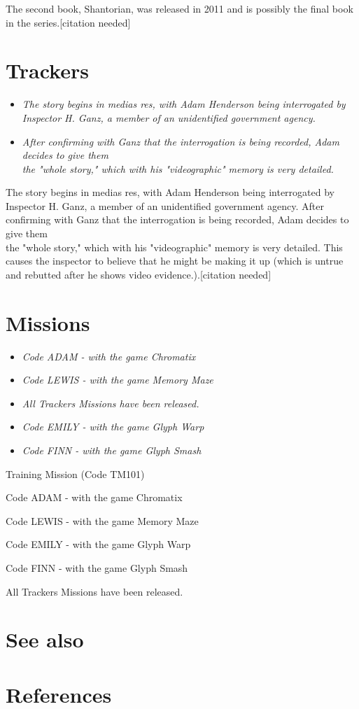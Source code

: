 The second book, Shantorian, was released in 2011 and is possibly the
final book in the series.{[}citation needed{]}

\section{Trackers}\label{trackers}

\begin{itemize}
\item
  \emph{The story begins in medias res, with Adam Henderson being
  interrogated by Inspector H. Ganz, a member of an unidentified
  government agency.}
\item
  \emph{After confirming with Ganz that the interrogation is being
  recorded, Adam decides to give them\\
  the "whole story," which with his "videographic" memory is very
  detailed.}
\end{itemize}

The story begins in medias res, with Adam Henderson being interrogated
by Inspector H. Ganz, a member of an unidentified government agency.
After confirming with Ganz that the interrogation is being recorded,
Adam decides to give them\\
the "whole story," which with his "videographic" memory is very
detailed. This causes the inspector to believe that he might be making
it up (which is untrue and rebutted after he shows video
evidence.).{[}citation needed{]}

\section{Missions}\label{missions}

\begin{itemize}
\item
  \emph{Code ADAM - with the game Chromatix}
\item
  \emph{Code LEWIS - with the game Memory Maze}
\item
  \emph{All Trackers Missions have been released.}
\item
  \emph{Code EMILY - with the game Glyph Warp}
\item
  \emph{Code FINN - with the game Glyph Smash}
\end{itemize}

Training Mission (Code TM101)

Code ADAM - with the game Chromatix

Code LEWIS - with the game Memory Maze

Code EMILY - with the game Glyph Warp

Code FINN - with the game Glyph Smash

All Trackers Missions have been released.

\section{See also}\label{see-also}

\section{References}\label{references}
